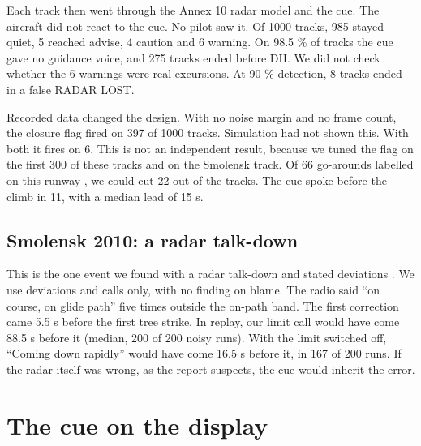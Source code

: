 \documentclass{ideathon2026}
\begin{document}
Each track then went through the Annex 10 radar model and the cue. The aircraft did not react to the cue. No pilot saw it. Of 1000
tracks, 985 stayed quiet, 5 reached advise, 4 caution and 6 warning. On 98.5 \% of tracks the cue gave no guidance voice, and 275
tracks ended before DH. We did not check whether the 6 warnings were real excursions. At 90 \% detection, 8 tracks ended in a false
RADAR LOST.

Recorded data changed the design. With no noise margin and no frame count, the closure flag fired on 397 of 1000 tracks. Simulation
had not shown this. With both it fires on 6. This is not an independent result, because we tuned the flag on the first 300 of these
tracks and on the Smolensk track. Of 66 go-arounds labelled on this runway \cite{zenodo}, we could cut 22 out of the tracks. The cue
spoke before the climb in 11, with a median lead of 15 s.

\subsection{Smolensk 2010: a radar talk-down}
This is the one event we found with a radar talk-down and stated deviations \cite{smolensk}. We use deviations and calls only, with no
finding on blame. The radio said ``on course, on glide path'' five times outside the on-path band. The first correction came 5.5 s
before the first tree strike. In replay, our limit call would have come 88.5 s before it (median, 200 of 200 noisy runs). With the
limit switched off, ``Coming down rapidly'' would have come 16.5 s before it, in 167 of 200 runs. If the radar itself was wrong, as
the report suspects, the cue would inherit the error.

\section{The cue on the display}
\end{document}
